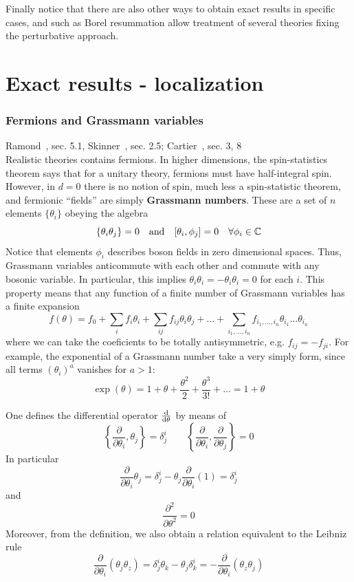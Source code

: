 \documentclass[../main/main.tex]{subfiles}
\begin{document}
Finally notice that there are also other ways to obtain exact results in specific cases, and such as Borel resummation allow treatment of several theories fixing the perturbative approach. 

\section{Exact results - localization}

\subsubsection{Fermions and Grassmann variables}

\textsf{Ramond~\cite{Ramond:1997aa}, sec. 5.1, Skinner~\cite{Skinner:2018aa}, sec. 2.5; Cartier~\cite{Cartier:2002aa}, sec. 3, 8}\\

Realistic theories contains fermions. In higher dimensions, the spin-statistics theorem says that for a unitary theory, fermions must have half-integral spin. However, in $d=0$ there is no notion of spin, much less a spin-statistic theorem, and fermionic ``fields'' are simply \textbf{Grassmann numbers}. These are a set of $n$ elements $\{\theta_i\}$ obeying the algebra
\[\{\theta_i\theta_j\}=0\quad\text{and}\quad[\theta_i,\phi_j]=0\quad\forall\phi_i\in\mathbb{C}\]
Notice that elements $\phi_i$ describes boson fields in zero dimensional spaces. 
Thus, Grassmann variables anticommute with each other and commute with any bosonic variable. In particular, this implies $\theta_i\theta_i=-\theta_i\theta_i=0$ for each $i$. This property means that any function of a finite number of Grassmann variables has a finite expansion
\[f(\theta)=f_0+\sum_if_i\theta_i+\sum_{ij}f_{ij}\theta_i\theta_j+\dots+\sum_{i_1,\dots,i_n}f_{i_1,\dots,i_n}\theta_{i_1}\dots\theta_{i_n}\]
where we can take the coeficients to be totally antisymmetric, e.g. $f_{ij}=-f_{ji}$. For example, the exponential of a Grassmann number take a very simply form, since all terms $(\theta_i)^a$ vanishes for $a>1$:
\[\exp(\theta)=1+\theta+\frac{\theta^2}{2}+\frac{\theta^3}{3!}+\dots=1+\theta\]

One defines the differential operator $\frac{\textup{d}}{\textup{d}\theta}$ by means of
\[\left\{\frac{\partial}{\partial\theta_i},\theta_j\right\}=\delta^i_j\qquad\left\{\frac{\partial}{\partial\theta_i},\frac{\partial}{\partial\theta_j}\right\}=0\]
In particular
\[\frac{\partial}{\partial\theta_i}\theta_j=\delta^i_j-\theta_j\frac{\partial}{\partial\theta_i}(1)=\delta^i_j\]
and
\[\frac{\partial^2}{\partial\theta^2}=0\]
Moreover, from the definition, we also obtain a relation equivalent to the Leibniz rule
\[\frac{\partial}{\partial\theta_i}(\theta_j\theta_z)=\delta^i_j\theta_k-\theta_j\delta^i_k=-\frac{\partial}{\partial\theta_i}(\theta_z\theta_j)\]
\end{document}

